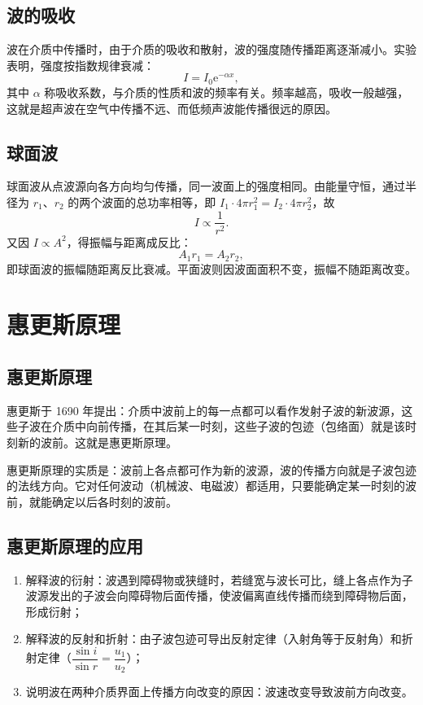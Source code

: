     \subsection{波的吸收}
    波在介质中传播时，由于介质的吸收和散射，波的强度随传播距离逐渐减小。实验表明，强度按指数规律衰减：
    \[
    I=I_0\mathrm{e}^{-\alpha x},
    \]
    其中 $\alpha$ 称吸收系数，与介质的性质和波的频率有关。频率越高，吸收一般越强，这就是超声波在空气中传播不远、而低频声波能传播很远的原因。

    \subsection{球面波}
    球面波从点波源向各方向均匀传播，同一波面上的强度相同。由能量守恒，通过半径为 $r_1$、$r_2$ 的两个波面的总功率相等，即 $I_1\cdot4\pi r_1^{2}=I_2\cdot4\pi r_2^{2}$，故
    \[
    I\propto\frac{1}{r^{2}}.
    \]
    又因 $I\propto A^{2}$，得振幅与距离成反比：
    \[
    A_1r_1=A_2r_2,
    \]
    即球面波的振幅随距离反比衰减。平面波则因波面面积不变，振幅不随距离改变。


\section{惠更斯原理}
    \subsection{惠更斯原理}
    惠更斯于 1690 年提出：介质中波前上的每一点都可以看作发射子波的新波源，这些子波在介质中向前传播，在其后某一时刻，这些子波的包迹（包络面）就是该时刻新的波前。这就是惠更斯原理。

    惠更斯原理的实质是：波前上各点都可作为新的波源，波的传播方向就是子波包迹的法线方向。它对任何波动（机械波、电磁波）都适用，只要能确定某一时刻的波前，就能确定以后各时刻的波前。

    \subsection{惠更斯原理的应用}
    \begin{enumerate}
        \item 解释波的衍射：波遇到障碍物或狭缝时，若缝宽与波长可比，缝上各点作为子波源发出的子波会向障碍物后面传播，使波偏离直线传播而绕到障碍物后面，形成衍射；
        \item 解释波的反射和折射：由子波包迹可导出反射定律（入射角等于反射角）和折射定律（$\dfrac{\sin i}{\sin r}=\dfrac{u_1}{u_2}$）；
        \item 说明波在两种介质界面上传播方向改变的原因：波速改变导致波前方向改变。
    \end{enumerate}

